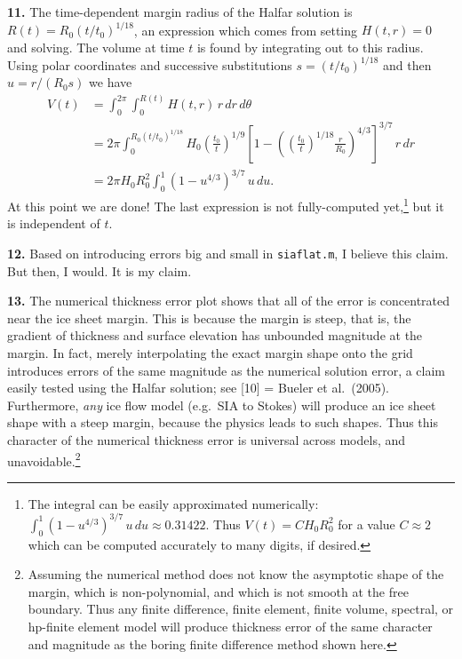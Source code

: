 \documentclass[10pt]{amsart}
\newcommand{\prob}[1]{\bigskip\noindent\large\textbf{#1.}\normalsize }
\begin{document}
\prob{11}  The time-dependent margin radius of the Halfar solution is $R(t) = R_0 (t/t_0)^{1/18}$, an expression which comes from setting $H(t,r)=0$ and solving.  The volume at time $t$ is found by integrating out to this radius.  Using polar coordinates and successive substitutions $s = (t/t_0)^{1/18}$ and then $u=r/(R_0 s)$ we have
\begin{align*}
V(t) &= \int_0^{2\pi} \int_0^{R(t)} H(t,r) \,r\,dr\,d\theta \\
     &= 2\pi \int_0^{R_0 (t/t_0)^{1/18}} H_0 \left(\frac{t_0}{t}\right)^{1/9} \left[1 - \left(\left(\frac{t_0}{t}\right)^{1/18} \frac{r}{R_0}\right)^{4/3}\right]^{3/7} \,r\,dr \\
     &= 2\pi H_0 R_0^2 \int_0^1 \left(1 - u^{4/3}\right)^{3/7} \,u\,du.
\end{align*}
At this point we are done!  The last expression is not fully-computed yet,\footnote{The integral can be easily approximated numerically: $\int_0^1 (1 - u^{4/3})^{3/7} \,u\,du \approx 0.31422$.  Thus $V(t) = C H_0 R_0^2$ for a value $C\approx 2$ which can be computed accurately to many digits, if desired.} but it is independent of $t$.

\prob{12}  Based on introducing errors big and small in \texttt{siaflat.m}, I believe this claim.  But then, I would.  It is my claim.

\prob{13}  The numerical thickness error plot shows that all of the error is concentrated near the ice sheet margin.  This is because the margin is steep, that is, the gradient of thickness and surface elevation has unbounded magnitude at the margin.  In fact, merely interpolating the exact margin shape onto the grid introduces errors of the same magnitude as the numerical solution error, a claim easily tested using the Halfar solution; see [10] = Bueler et al.~(2005).  Furthermore, \emph{any} ice flow model (e.g.~SIA to Stokes) will produce an ice sheet shape with a steep margin, because the physics leads to such shapes.  Thus this character of the numerical thickness error is universal across models, and unavoidable.\footnote{Assuming the numerical method does not know the asymptotic shape of the margin, which is non-polynomial, and which is not smooth at the free boundary.  Thus any finite difference, finite element, finite volume, spectral, or hp-finite element model will produce thickness error of the same character and magnitude as the boring finite difference method shown here.}
\end{document}
